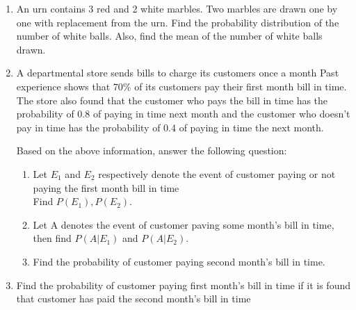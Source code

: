 \begin{enumerate}
\item An urn contains 3 red and 2 white marbles. Two marbles are drawn one by one with replacement from the urn. Find the probability distribution of the number of white balls. Also, find the mean of the number of white balls drawn.
\item A departmental store sends bills to charge its customers once a month Past experience shows that $ 70\% $ of its customers pay their first month bill in time. The store also found that the customer who pays the bill in time has the probability of 0.8 of paying in time next month and the customer who doesn't pay in time has the probability of 0.4 of paying in time the next month.

Based on the above information, answer the following question:
\begin{enumerate}
\item Let  $E_1$ and $E_2$ respectively denote the event of customer paying or not paying the first month bill in time\\
Find $P(E_1),P(E_2).$
\item Let A denotes the event of customer paving some month's bill in time, then find $P(A|E_1)$ and $P(A|E_2).$
\item Find the probability of customer paying second month's bill in time.
\end{enumerate}

\item Find the probability of customer paying first month's bill in time if it is found that customer has paid the second month's bill in time
\end{enumerate}

